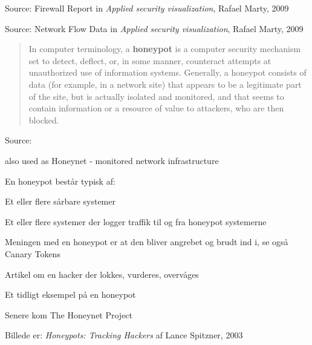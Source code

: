 \documentclass[Screen16to9,17pt]{foils}
\begin{document}

Source: Firewall Report in \emph{Applied security visualization}, Rafael Marty, 2009




Source: Network Flow Data in \emph{Applied security visualization}, Rafael Marty, 2009




\vskip 1cm
\begin{quote}
In computer terminology, a {\bf honeypot} is a computer security mechanism set to detect, deflect, or, in some manner, counteract attempts at unauthorized use of information systems. Generally, a honeypot consists of data (for example, in a network site) that appears to be a legitimate part of the site, but is actually isolated and monitored, and that seems to contain information or a resource of value to attackers, who are then blocked.
\end{quote}

Source:

also used as Honeynet - monitored network infrastructure

\begin{list1}
\item En honeypot består typisk af:
  \begin{list2}
    \item Et eller flere sårbare systemer
\item Et eller flere systemer der logger traffik til og fra honeypot
  systemerne
  \end{list2}
\item Meningen med en honeypot er at den bliver angrebet og brudt ind
  i, se også Canary Tokens
\end{list1}






\begin{list1}
\item Artikel om en hacker der lokkes, vurderes, overvåges
\item Et tidligt eksempel på en honeypot
\item Senere kom The Honeynet Project 
\item Billede er: \emph{Honeypots: Tracking Hackers}
af Lance Spitzner, 2003
\end{list1}
\end{document}
